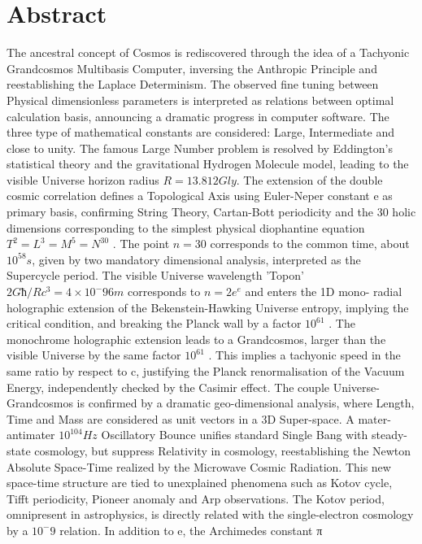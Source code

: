 
\chapter*{Abstract}
\vspace{-40pt}
The ancestral concept of Cosmos is rediscovered through the idea of a Tachyonic
Grandcosmos Multibasis Computer, inversing the Anthropic Principle and reestablishing
the Laplace Determinism. The observed fine tuning between Physical dimensionless
parameters is interpreted as relations between optimal calculation basis, announcing a
dramatic progress in computer software. The three type of mathematical constants are
considered: Large, Intermediate and close to unity. The famous Large Number problem is
resolved by Eddington's statistical theory and the gravitational Hydrogen Molecule model,
leading to the visible Universe horizon radius $R = 13.812 Gly$. The extension of
the double cosmic correlation defines a Topological Axis using Euler-Neper constant e as
primary basis, confirming String Theory, Cartan-Bott periodicity and the 30 holic
dimensions corresponding to the simplest physical diophantine equation $T^2 = L^3 = M^5 =
N^30$ . The point $n = 30$ corresponds to the common time, about $10^58 s$, given by two
mandatory dimensional analysis, interpreted as the Supercycle period. The visible Universe
wavelength 'Topon' $2G ħ/ Rc^3 = 4 × 10^-96 m$ corresponds to $n = 2e^e$ and enters the 1D mono-
radial holographic extension of the Bekenstein-Hawking Universe entropy, implying the
critical condition, and breaking the Planck wall by a factor $10^61$ . The monochrome
holographic extension leads to a Grandcosmos, larger than the visible Universe by the
same factor $10^61$ . This implies a tachyonic speed in the same ratio by respect to c, justifying
the Planck renormalisation of the Vacuum Energy, independently checked by the Casimir
effect. The couple Universe-Grandcosmos is confirmed by a dramatic geo-dimensional
analysis, where Length, Time and Mass are considered as unit vectors in a 3D Super-space.
A mater-antimater $10^104 Hz$ Oscillatory Bounce unifies standard Single Bang with steady-
state cosmology, but suppress Relativity in cosmology, reestablishing the Newton Absolute
Space-Time realized by the Microwave Cosmic Radiation. This new space-time structure are
tied to unexplained phenomena such as Kotov cycle, Tifft periodicity, Pioneer anomaly and
Arp observations. The Kotov period, omnipresent in astrophysics, is directly related with the
single-electron cosmology by a $10^-9$ relation. In addition to e, the Archimedes constant π
